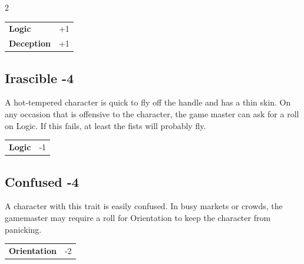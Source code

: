 \begin{multicols}{2}
\begin{tcolorbox}
\vspace{3mm}

\begin{tabular}{@{}ll@{}}
    \textbf{Logic} & +1\\
    \textbf{Deception} & +1\\
\end{tabular}


\end{tcolorbox}

\begin{tcolorbox}
    \subsection*{Irascible \hfill \small{-4 }}
    \tcblower
A hot-tempered character is quick to fly off the handle and has a thin skin. On any occasion that is offensive to the character, the game master can ask for a roll on Logic. If this fails, at least the fists will probably fly.


\vspace{3mm}

\begin{tabular}{@{}ll@{}}
    \textbf{Logic} & -1\\
\end{tabular}


\end{tcolorbox}

\begin{tcolorbox}
    \subsection*{Confused \hfill \small{-4 }}
    \tcblower
A character with this trait is easily confused. In busy markets or crowds, the gamemaster may require a roll for Orientation to keep the character from panicking.


\vspace{3mm}

\begin{tabular}{@{}ll@{}}
    \textbf{Orientation} & -2\\
\end{tabular}


\end{tcolorbox}
\end{multicols}
